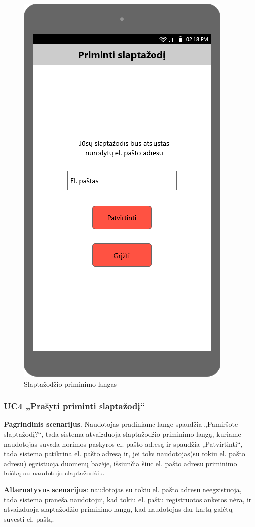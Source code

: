\documentclass{VUMIFPSbakalaurinis}
\begin{document}
\begin{figure}[H]
	\centering
	\includegraphics[scale=0.4]{img/ScreenShots/03-Slaptažodžio-priminimo-langas}
	\caption{Slaptažodžio priminimo langas}
	\label{img:forget pass}
\end{figure}
\subsubsection{UC4 „Prašyti priminti slaptažodį“}
\textbf{Pagrindinis scenarijus}. Naudotojas pradiniame lange spaudžia „Pamiršote slaptažodį?“, tada sistema atvaizduoja slaptažodžio priminimo langą, kuriame naudotojas suveda norimos paskyros el. pašto adresą ir spaudžia „Patvirtinti“, tada sistema patikrina el. pašto adresą ir, jei toks naudotojas(su tokiu el. pašto adresu) egzistuoja duomenų bazėje, išsiunčia šiuo el. pašto adresu priminimo laišką su naudotojo slaptažodžiu. 
\par \textbf{Alternatyvus scenarijus}: naudotojas su tokiu el. pašto adresu neegzistuoja, tada sistema praneša naudotojui, kad tokiu el. paštu registruotos anketos nėra, ir atvaizduoja slaptažodžio priminimo langą, kad naudotojas dar kartą galėtų suvesti el. paštą.
\end{document}
